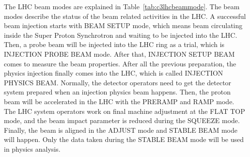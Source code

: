 \par The LHC beam modes are explained in Table~\ref{tab:c3lhcbeammode}. The beam modes describe the status of the beam related activities in the LHC. A successful beam injection starts with BEAM SETUP mode, which means beam circulating inside the Super Proton Synchrotron and waiting to be injected into the LHC. Then, a probe beam will be injected into the LHC ring as a trial, which is INJECTION PROBE BEAM mode. After that, INJECTION SETUP BEAM comes to measure the beam properties. After all the previous preparation, the physics injection finally comes into the LHC, which is called INJECTION PHYSICS BEAM. Normally, the detector operators need to get the detector system prepared when an injection physics beam happens. Then, the proton beam will be accelerated in the LHC with the PRERAMP and RAMP mode. The LHC system operators work on final machine adjustment at the FLAT TOP mode, and the beam impact parameter is reduced during the SQUEEZE mode. Finally, the beam is aligned in the ADJUST mode and STABLE BEAM mode will happen. Only the data taken during the STABLE BEAM mode will be used in physics analysis.

